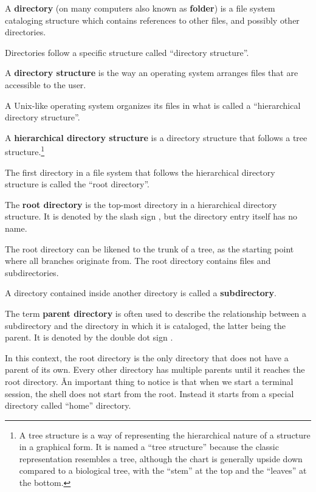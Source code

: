 A \textbf{directory} (on many computers also known as \textbf{folder}) is a file system cataloging structure which
contains references to other files, and possibly other directories.
\ed

Directories follow a specific structure called ``directory structure''.

A \textbf{directory structure} is the way an operating system arranges files that are accessible to the user.
\ed

A Unix-like operating system organizes its files in what is called a ``hierarchical directory structure''.

A \textbf{hierarchical directory structure} is a directory structure that follows a tree structure.\footnote{A tree
structure is a way of representing the hierarchical nature of a structure in a graphical form. It is named a
``tree structure'' because the classic representation resembles a tree, although the chart is generally upside down
compared to a biological tree, with the ``stem'' at the top and the ``leaves'' at the bottom.}
\ed

The first directory in a file system that follows the hierarchical directory structure is called the ``root directory''.

The \textbf{root directory} is the top-most directory in a hierarchical directory structure. It is denoted by the slash
sign \code{/}, but the directory entry itself has no name.
\ed

The root directory can be likened to the trunk of a tree, as the starting point where all branches originate from. The
root directory contains files and subdirectories.

\bd[Subdirectory]
A directory contained inside another directory is called a \textbf{subdirectory}.
\ed

The term \textbf{parent directory} is often used to describe the relationship between a subdirectory and the
directory in which it is cataloged, the latter being the parent. It is denoted by the double dot sign .
\ed

In this context, the root directory is the only directory that does not have a parent of its own. Every other directory
has multiple parents until it reaches the root directory. \v

An important thing to notice is that when we start a terminal session, the shell does not start from the root. Instead
it starts from a special directory called ``home'' directory.


